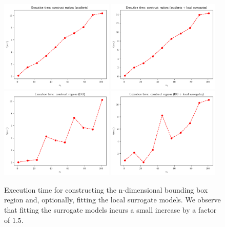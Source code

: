 \begin{figure}[h]
    \begin{center}
      \includegraphics[width=0.48\textwidth]{./Thesis/images/chapter4/exec_regions_grad.png}
      \includegraphics[width=0.48\textwidth]{./Thesis/images/chapter4/exec_regions_grad_fit.png}\\
      \includegraphics[width=0.48\textwidth]{./Thesis/images/chapter4/exec_regions_bo.png}
      \includegraphics[width=0.48\textwidth]{./Thesis/images/chapter4/exec_regions_bo_fit.png}
    \end{center}
    \caption{Execution time for constructing the n-dimensional
      bounding box region and, optionally, fitting the local surrogate
      models. We observe that fitting the surrogate models incurs a
      small increase by a factor of $1.5$.}
  \label{fig:exec_regions}
\end{figure}


